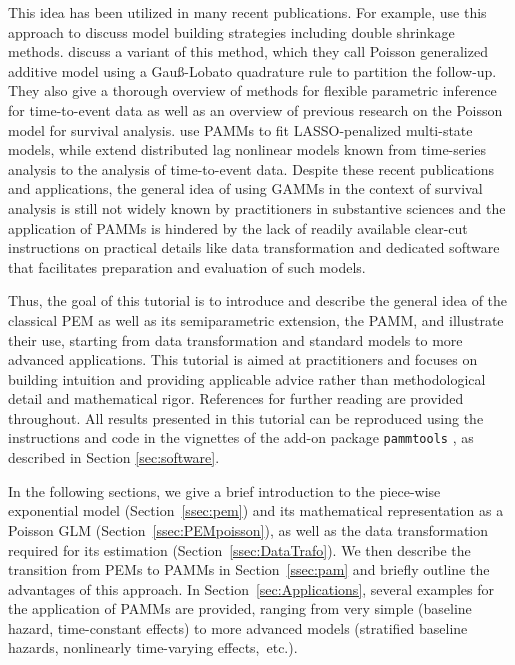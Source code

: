 \documentclass[submit]{smj}
\newcommand{\code}[1]{{\small \texttt{#1}}}
\begin{document}
This idea has been utilized in many recent publications.
For example, \cite{Rodriguez2013} use this approach to discuss model building
strategies including double shrinkage methods. \cite{Argyropoulos2015} discuss a
variant of this method, which they call Poisson generalized additive model using a
Gau{\ss}-Lobato quadrature rule to partition the follow-up. They also give a
thorough overview of methods for flexible parametric inference for time-to-event data
as well as an overview of previous research on the Poisson model for survival
analysis.
\cite{Sennhenn2016} use PAMMs to fit LASSO-penalized multi-state
models, while \cite{Gasparrini2017} extend distributed lag nonlinear models known
from time-series analysis to the analysis of time-to-event data.
Despite these recent publications and applications, the general
idea of using GAMMs in the context of survival analysis is still not widely known
by practitioners in substantive sciences and the application of PAMMs is hindered
by the lack of readily available clear-cut instructions on practical details
like data transformation and dedicated software that facilitates preparation and
evaluation of such models.

Thus, the goal of this tutorial is to introduce and describe the general idea
of the classical PEM as well as its semiparametric extension, the PAMM,
and illustrate their use, starting from data transformation and standard models
to more advanced applications. This tutorial is aimed at
practitioners and focuses on building intuition and providing applicable advice rather than
methodological detail and mathematical rigor. References for further reading
are provided throughout.
All results presented in this tutorial
can be reproduced using the instructions and code in the vignettes
of the add-on package \code{pammtools} \citep{Ben:2017}, as described in Section
\ref{sec:software}.

In the following sections, we give a brief introduction to the piece-wise
exponential model (Section~\ref{ssec:pem}) and its mathematical representation
as a Poisson GLM (Section~\ref{ssec:PEMpoisson}), as well as the data
transformation required for its estimation (Section~\ref{ssec:DataTrafo}).
We then describe the transition from PEMs to PAMMs in Section~\ref{ssec:pam} and
briefly outline the advantages of this approach. In Section~\ref{sec:Applications},
several examples for the application of PAMMs are provided, ranging from very
simple (baseline hazard, time-constant effects) to more advanced models
(stratified baseline hazards, nonlinearly time-varying effects,~etc.).
\end{document}
